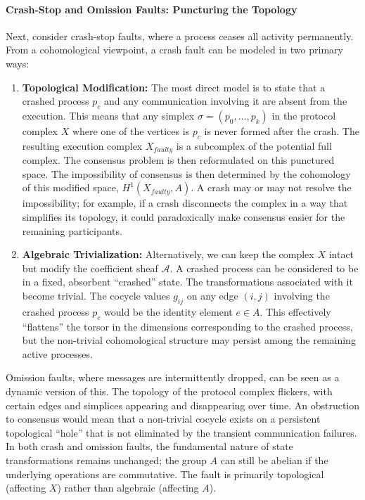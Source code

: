 \documentclass[
]{article}
\begin{document}
\paragraph{Crash-Stop and Omission Faults: Puncturing the
Topology}\label{crash-stop-and-omission-faults-puncturing-the-topology}

Next, consider crash-stop faults, where a process ceases all activity
permanently. From a cohomological viewpoint, a crash fault can be
modeled in two primary ways:

\begin{enumerate}
\def\labelenumi{\arabic{enumi}.}
\item
  \textbf{Topological Modification:} The most direct model is to state
  that a crashed process \(p_c\) and any communication involving it are
  absent from the execution. This means that any simplex
  \(\sigma = (p_0, \dots, p_k)\) in the protocol complex \(X\) where one
  of the vertices is \(p_c\) is never formed after the crash. The
  resulting execution complex \(X_{faulty}\) is a subcomplex of the
  potential full complex. The consensus problem is then reformulated on
  this punctured space. The impossibility of consensus is then
  determined by the cohomology of this modified space,
  \(H^1(X_{faulty}, A)\). A crash may or may not resolve the
  impossibility; for example, if a crash disconnects the complex in a
  way that simplifies its topology, it could paradoxically make
  consensus easier for the remaining participants.
\item
  \textbf{Algebraic Trivialization:} Alternatively, we can keep the
  complex \(X\) intact but modify the coefficient sheaf \(\mathcal{A}\).
  A crashed process can be considered to be in a fixed, absorbent
  ``crashed'' state. The transformations associated with it become
  trivial. The cocycle values \(g_{ij}\) on any edge \((i, j)\)
  involving the crashed process \(p_c\) would be the identity element
  \(e \in A\). This effectively ``flattens'' the torsor in the
  dimensions corresponding to the crashed process, but the non-trivial
  cohomological structure may persist among the remaining active
  processes.
\end{enumerate}

Omission faults, where messages are intermittently dropped, can be seen
as a dynamic version of this. The topology of the protocol complex
flickers, with certain edges and simplices appearing and disappearing
over time. An obstruction to consensus would mean that a non-trivial
cocycle exists on a persistent topological ``hole'' that is not
eliminated by the transient communication failures. In both crash and
omission faults, the fundamental nature of state transformations remains
unchanged; the group \(A\) can still be abelian if the underlying
operations are commutative. The fault is primarily topological
(affecting \(X\)) rather than algebraic (affecting \(A\)).
\end{document}

